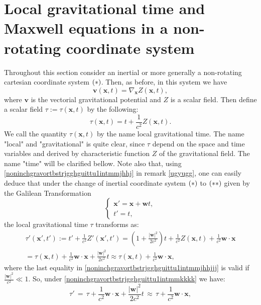 \documentclass{article}
\theoremstyle{definition}
\theoremstyle{remark}
\renewcommand{\vec}[1]{\mathbf{#1}}
\newcommand{\er}{\eqref}
\newcommand{\er}{\eqref}
\begin{document}
\section{Local gravitational time and Maxwell equations in a
non-rotating coordinate system}\label{GIGIGU}
Throughout this
section consider an inertial or more generally a non-rotating
cartesian coordinate system $\bf{(*)}$. Then, as before, in this
system we have
\begin{equation}\label{jhhjgjhuiiu}
\vec v(\vec x,t)=\nabla_{\vec x}Z(\vec x,t),
\end{equation}
where $\vec v$ is the vectorial gravitational potential and $Z$ is a
scalar field. Then define a scalar field $\tau:=\tau(\vec x,t)$ by
the following:
\begin{equation}\label{jhhjgjhuiiuiy}
\tau(\vec x,t)=t+\frac{1}{c^2}Z(\vec x,t).
\end{equation}
We call the quantity $\tau(\vec x,t)$ by the name local
gravitational time. The name "local" and "gravitational" is quite
clear, since $\tau$ depend on the space and time variables and
derived by characteristic function $Z$ of the gravitational field.
The name "time" will be clarified bellow. Note also that, using
\er{noninchgravortbstrjgghguittu1intmmjhhj} in remark \ref{ugyugg},
one can easily deduce that under the change of inertial coordinate
system $\bf{(*)}$ to $\bf{(**)}$ given by the Galilean
Transformation
\begin{equation}\label{noninchgravortbstrjgghguittu1intmmkkkk}
\begin{cases}
\vec x'=\vec x+\vec wt,\\
t'=t,
\end{cases}
\end{equation}
the local gravitational time $\tau$ transforms as:
\begin{multline}\label{noninchgravortbstrjgghguittu1intmmjhhjjj}
\tau'(\vec x',t'):= t'+\frac{1}{c^2}Z'(\vec
x',t')=\left(1+\frac{|\vec w|^2}{2c^2}\right)t+\frac{1}{c^2}Z(\vec
x,t)+ \frac{1}{c^2}\vec w\cdot\vec x\\=\tau(\vec
x,t)+\frac{1}{c^2}\vec w\cdot\vec x+\frac{|\vec w|^2}{2c^2}t \approx
\tau(\vec x,t)+\frac{1}{c^2}\vec w\cdot\vec x,
\end{multline}
where the last equality in
\er{noninchgravortbstrjgghguittu1intmmjhhjjj} is valid if
$\frac{|\vec w|^2}{c^2}\ll 1$. So, under
\er{noninchgravortbstrjgghguittu1intmmkkkk} we have:
\begin{equation}\label{noninchgravortbstrjgghguittu1intmmjhhjhjhj}
\tau'\,=\,\tau+\frac{1}{c^2}\vec w\cdot\vec x+\frac{|\vec
w|^2}{2c^2}t \,\approx\, \tau+\frac{1}{c^2}\vec w\cdot\vec x,
\end{equation}
\end{document}

